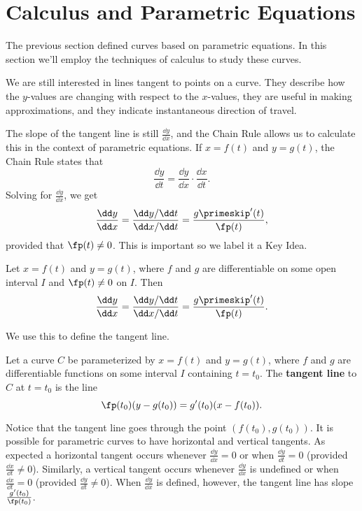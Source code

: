 \section{Calculus and Parametric Equations}\label{sec:par_calc}

The previous section defined curves based on parametric equations. In this section we'll employ the techniques of calculus to study these curves.

We are still interested in lines tangent to points on a curve. They describe how the $y$-values are changing with respect to the $x$-values, they are useful in making approximations, and they indicate instantaneous direction of travel.

The slope of the tangent line is still $\frac{\dd y}{\dd x}$, and the Chain Rule allows us to calculate this in the context of parametric equations. If $x=f(t)$ and $y=g(t)$, the Chain Rule states that
\[\frac{\dd y}{\dd t} = \frac{\dd y}{\dd x}\cdot\frac{\dd x}{\dd t}.\]
Solving for $\frac{\dd y}{\dd x}$, we get 
\[\frac{\dd y}{\dd x} = \frac{\dd y/\dd t}{\dd x/\dd t} = \frac{g\primeskip'(t)}{\fp(t)},\]
provided that $\fp(t)\neq 0$. This is important so we label it a Key Idea.

\begin{keyidea}\label{idea:dydxpar}
Let $x=f(t)$ and $y=g(t)$, where $f$ and $g$ are differentiable on some open interval $I$ and $\fp(t)\neq 0$ on $I$. Then 
\[
\frac{\dd y}{\dd x}=\frac{\dd y/\dd t}{\dd x/\dd t}=\frac{g\primeskip'(t)}{\fp(t)}.
\]
\end{keyidea}

We use this to define the tangent line.

\begin{definition}\label{def:tangent_par}
Let a curve $C$ be parameterized by $x=f(t)$ and $y=g(t)$, where $f$ and $g$ are differentiable functions on some interval $I$ containing $t=t_0$. The 
\textbf{tangent line} to $C$ at $t=t_0$ is the line
\[\fp(t_0)(y-g(t_0))=g'(t_0)(x-f(t_0)).\]
\end{definition}

Notice that the tangent line goes through the point $(f(t_0),g(t_0))$.  It is possible for parametric curves to have horizontal and vertical tangents. As expected a horizontal tangent occurs whenever $\frac{\dd y}{\dd x} = 0$ or when $\frac{\dd y}{\dd t} = 0$ (provided $\frac{\dd x}{\dd t} \neq 0$). Similarly, a vertical tangent occurs whenever $\frac{\dd y}{\dd x}$ is undefined or when $\frac{\dd x}{\dd t} = 0$ (provided $\frac{\dd y}{\dd t} \neq 0$).  When $\frac{\dd y}{\dd x}$ is defined, however, the tangent line has slope $\frac{g'(t_0)}{\fp(t_0)}$.

